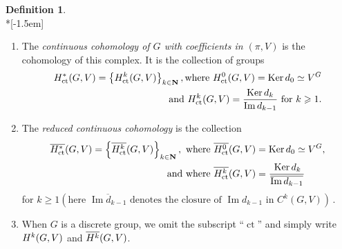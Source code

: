 \documentclass[11pt]{article}
\theoremstyle{definition}
\newtheorem{defi}[theo]{Definition}
\numberwithin{equation}{section}
\numberwithin{figure}{section}
\numberwithin{table}{section}
\DeclareMathOperator{\Ker}{Ker}
\DeclareMathOperator{\im}{Im}
\DeclareMathOperator{\ct}{ct}
\begin{document}
\goodbreak
\begin{defi}\label{ell_pcont_def}\ \\*[-1.5em]
\begin{enumerate}
\item The \emph{continuous cohomology of $G$ with coefficients in $(\pi,V)$} is the cohomology of this complex. It is the collection of groups 
\begin{align*}
{\rm H}_{\ct}^* (G, V) = \left\{{\rm H}_{\ct}^k (G, V)\right\}_{k \in {\bf N}}, \text{where }{\rm H}_{\ct} ^0 (G, V)
= \Ker d_0 \simeq V^G\\
\text{ and }{\rm H}_{\ct}^k (G, V) = \frac{\Ker d_k}{\im d_{k-1}}\text{ for }k \geqslant 1.
\end{align*}
\item The \emph{reduced continuous cohomology} is the collection 
\begin{align*}
\overline{{\rm H}_{\ct}^*} (G, V) =
\left\{\overline{{\rm H}_{\ct}^k} (G, V) \right\}_{k \in {\bf N}}, \text{ where }\overline{{\rm H}_{\ct} ^0} (G, V) &= \Ker d_0 \simeq V^G,\\ 
\text{ and where }\overline{{\rm H}_{\ct}^k} (G, V) &=  \frac{\phantom{\mkern5mu}\Ker d_k\phantom{\mkern5mu}}{\overline{\im d_{k-1}}}
\end{align*}
for $k \geqslant 1 (\text{here }\overline{\im d_{k-1}}\text{ denotes the closure of } \im d_{k-1}\text{ in }C^k (G,V))\,.$
\item When $G$ is a discrete group, we omit the subscript ``$\ct$'' and simply write ${\rm H}^k (G, V)$ and $\overline{{\rm H}^k} (G, V)$.
\end{enumerate}
\end{defi}
\end{document}
